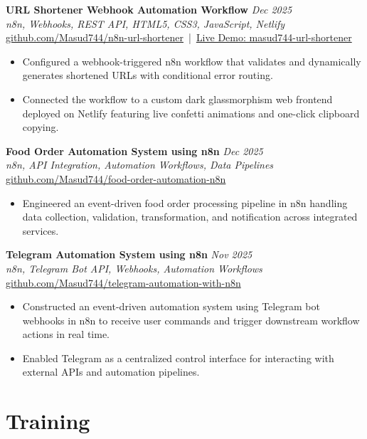 \documentclass[11pt,a4paper]{article}
\begin{document}
\textbf{URL Shortener Webhook Automation Workflow} \hfill \textit{Dec 2025} \\
\textit{n8n, Webhooks, REST API, HTML5, CSS3, JavaScript, Netlify} \\
\href{https://github.com/Masud744/n8n-url-shortener}{github.com/Masud744/n8n-url-shortener} \,|\, \href{https://masud744-url-shortener.netlify.app/}{Live Demo: masud744-url-shortener}
\begin{itemize}
    \item Configured a webhook-triggered n8n workflow that validates and dynamically generates shortened URLs with conditional error routing.
    \item Connected the workflow to a custom dark glassmorphism web frontend deployed on Netlify featuring live confetti animations and one-click clipboard copying.
\end{itemize}

\textbf{Food Order Automation System using n8n} \hfill \textit{Dec 2025} \\
\textit{n8n, API Integration, Automation Workflows, Data Pipelines} \\
\href{https://github.com/Masud744/food-order-automation-n8n}{github.com/Masud744/food-order-automation-n8n}
\begin{itemize}
    \item Engineered an event-driven food order processing pipeline in n8n handling data collection, validation, transformation, and notification across integrated services.
\end{itemize}

\textbf{Telegram Automation System using n8n} \hfill \textit{Nov 2025} \\
\textit{n8n, Telegram Bot API, Webhooks, Automation Workflows} \\
\href{https://github.com/Masud744/telegram-automation-with-n8n}{github.com/Masud744/telegram-automation-with-n8n}
\begin{itemize}
    \item Constructed an event-driven automation system using Telegram bot webhooks in n8n to receive user commands and trigger downstream workflow actions in real time.
    \item Enabled Telegram as a centralized control interface for interacting with external APIs and automation pipelines.
\end{itemize}


\section*{Training}
\end{document}
